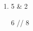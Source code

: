 \documentclass[a4paper]{article}
\begin{document}
	\begin{enumerate}[1.]
		\item \begin{pmatrix}5 & 2\end{pmatrix}
		\begin{pmatrix}6 // 8\end{pmatrix}
	\end{enumerate}
\end{document}
